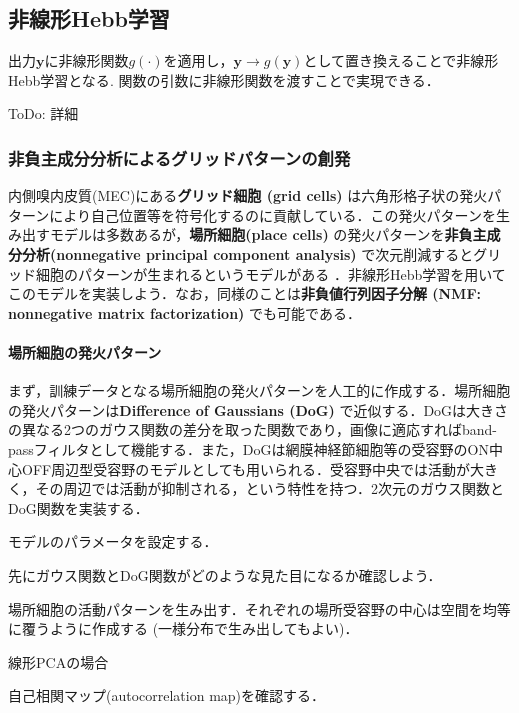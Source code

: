 \subsection{非線形Hebb学習}
出力$\mathbf{y}$に非線形関数$g(\cdot)$を適用し，$\mathbf{y}\to g(\mathbf{y})$として置き換えることで非線形Hebb学習となる\citep{Oja1997-hr}\citep{Brito2016-mx}. 関数の引数に非線形関数を渡すことで実現できる．

ToDo: 詳細
\subsubsection{非負主成分分析によるグリッドパターンの創発}
内側嗅内皮質(MEC)にある\textbf{グリッド細胞 (grid cells)} は六角形格子状の発火パターンにより自己位置等を符号化するのに貢献している．この発火パターンを生み出すモデルは多数あるが，\textbf{場所細胞(place cells)} の発火パターンを\textbf{非負主成分分析(nonnegative principal component analysis)} で次元削減するとグリッド細胞のパターンが生まれるというモデルがある \citep{Dordek2016-ff}．非線形Hebb学習を用いてこのモデルを実装しよう．なお，同様のことは\textbf{非負値行列因子分解 (NMF: nonnegative matrix factorization)} でも可能である．
\paragraph{場所細胞の発火パターン}
まず，訓練データとなる場所細胞の発火パターンを人工的に作成する．場所細胞の発火パターンは\textbf{Difference of Gaussians (DoG)} で近似する．DoGは大きさの異なる2つのガウス関数の差分を取った関数であり，画像に適応すればband-passフィルタとして機能する．また，DoGは網膜神経節細胞等の受容野のON中心OFF周辺型受容野のモデルとしても用いられる．受容野中央では活動が大きく，その周辺では活動が抑制される，という特性を持つ．2次元のガウス関数とDoG関数を実装する．

モデルのパラメータを設定する．

先にガウス関数とDoG関数がどのような見た目になるか確認しよう．



場所細胞の活動パターンを生み出す．それぞれの場所受容野の中心は空間を均等に覆うように作成する (一様分布で生み出してもよい)．

線形PCAの場合



自己相関マップ(autocorrelation map)を確認する．

